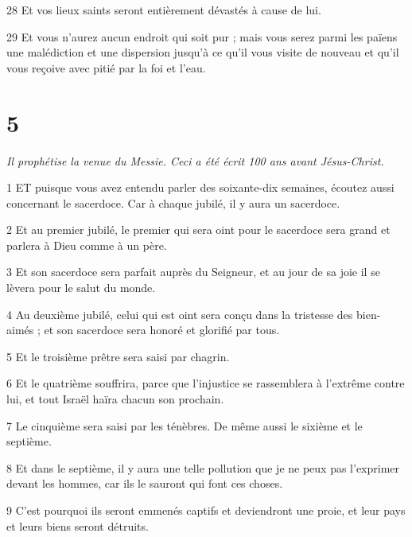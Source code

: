 \par 28 Et vos lieux saints seront entièrement dévastés à cause de lui.

\par 29 Et vous n'aurez aucun endroit qui soit pur ; mais vous serez parmi les païens une malédiction et une dispersion jusqu'à ce qu'il vous visite de nouveau et qu'il vous reçoive avec pitié par la foi et l'eau.

\chapter{5}

\par \textit{Il prophétise la venue du Messie. Ceci a été écrit 100 ans avant Jésus-Christ.}

\par 1 ET puisque vous avez entendu parler des soixante-dix semaines, écoutez aussi concernant le sacerdoce. Car à chaque jubilé, il y aura un sacerdoce.

\par 2 Et au premier jubilé, le premier qui sera oint pour le sacerdoce sera grand et parlera à Dieu comme à un père.

\par 3 Et son sacerdoce sera parfait auprès du Seigneur, et au jour de sa joie il se lèvera pour le salut du monde.

\par 4 Au deuxième jubilé, celui qui est oint sera conçu dans la tristesse des bien-aimés ; et son sacerdoce sera honoré et glorifié par tous.

\par 5 Et le troisième prêtre sera saisi par chagrin.

\par 6 Et le quatrième souffrira, parce que l'injustice se rassemblera à l'extrême contre lui, et tout Israël haïra chacun son prochain.

\par 7 Le cinquième sera saisi par les ténèbres. De même aussi le sixième et le septième.

\par 8 Et dans le septième, il y aura une telle pollution que je ne peux pas l'exprimer devant les hommes, car ils le sauront qui font ces choses.

\par 9 C'est pourquoi ils seront emmenés captifs et deviendront une proie, et leur pays et leurs biens seront détruits.

